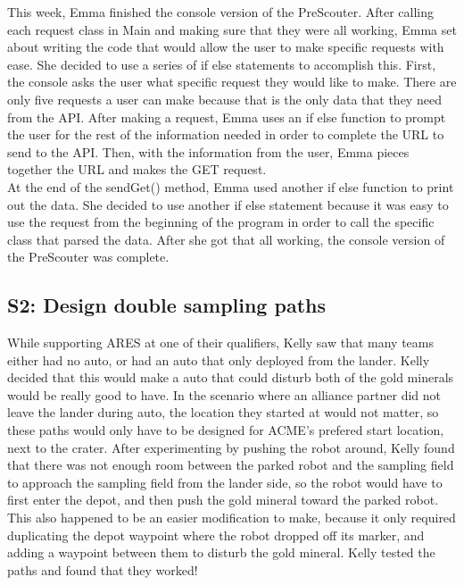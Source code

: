 \documentclass{article}
\begin{document}
This week, Emma finished the console version of the PreScouter. After calling each request class in Main and making sure that they were all working, Emma set about writing the code that would allow the user to make specific requests with ease. She decided to use a series of if else statements to accomplish this. First, the console asks the user what specific request they would like to make. There are only five requests a user can make because that is the only data that they need from the API. After making a request, Emma uses an if else function to prompt the user for the rest of the information needed in order to complete the URL to send to the API. Then, with the information from the user, Emma pieces together the URL and makes the GET request.\\

At the end of the sendGet() method, Emma used another if else function to print out the data. She decided to use another if else statement because it was easy to use the request from the beginning of the program in order to call the specific class that parsed the data. After she got that all working, the console version of the PreScouter was complete. \\


\subsection{S2: Design double sampling paths}

While supporting ARES at one of their qualifiers, Kelly saw that many teams either had no auto, or had an auto that only deployed from the lander. Kelly decided that this would make a auto that could disturb both of the gold minerals would be really good to have. In the scenario where an alliance partner did not leave the lander during auto, the location they started at would not matter, so these paths would only have to be designed for ACME's prefered start location, next to the crater. After experimenting by pushing the robot around, Kelly found that there was not enough room between the parked robot and the sampling field to approach the sampling field from the lander side, so the robot would have to first enter the depot, and then push the gold mineral toward the parked robot. This also happened to be an easier modification to make, because it only required duplicating the depot waypoint where the robot dropped off its marker, and adding a waypoint between them to disturb the gold mineral. Kelly tested the paths and found that they worked!
\end{document}
